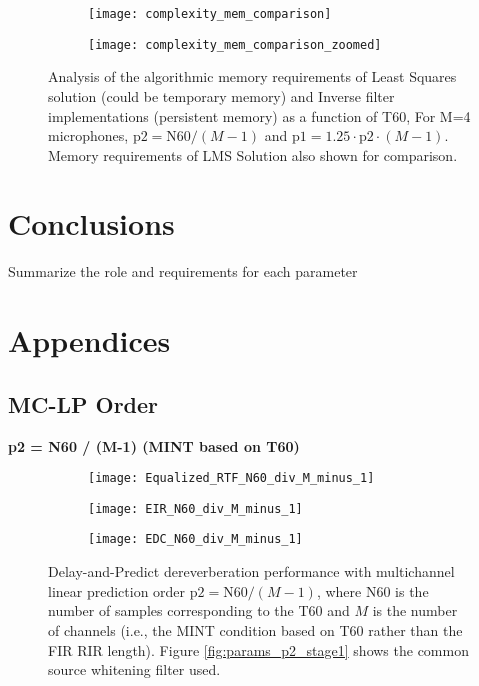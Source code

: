 \begin{figure}[H]
	\centering
	\begin{subfigure}[b]{0.45\textwidth}
		\centering
		\texttt{[image: complexity\_mem\_comparison]}
	\end{subfigure}
	\hfill
	\begin{subfigure}[b]{0.45\textwidth}
		\centering
		\texttt{[image: complexity\_mem\_comparison\_zoomed]}
	\end{subfigure}
	\caption{Analysis of the algorithmic memory requirements  of Least Squares solution (could be temporary memory) and Inverse filter implementations (persistent memory) as a function of T60, For M=4 microphones, $\mathrm{p2} = \mathrm{N60}/(M-1)$ and $\mathrm{p1} = 1.25 \cdot \mathrm{p2} \cdot (M-1)$. Memory requirements of LMS Solution also shown for comparison.}
	\label{fig:complexity_memory}
\end{figure}



\section{Conclusions}

Summarize the role and requirements for each parameter



\section{Appendices}

\subsection{MC-LP Order}

\textbf{p2 = N60 / (M-1)  (MINT based on T60)}

\begin{figure}[H]
	\centering
	\begin{subfigure}[b]{0.32\textwidth}
		\centering
		\texttt{[image: Equalized\_RTF\_N60\_div\_M\_minus\_1]}
	\end{subfigure}
	\hfill
	\begin{subfigure}[b]{0.32\textwidth}
		\centering
		\texttt{[image: EIR\_N60\_div\_M\_minus\_1]}
	\end{subfigure}
	\hfill
	\begin{subfigure}[b]{0.32\textwidth}
		\centering
		\texttt{[image: EDC\_N60\_div\_M\_minus\_1]}
	\end{subfigure}
	\hfill
	\caption{Delay-and-Predict dereverberation performance with multichannel linear prediction order $\mathrm{p2} = \mathrm{N60} / (M-1)$, where N60 is the number of samples corresponding to the T60 and $M$ is the number of channels (i.e., the MINT condition based on T60 rather than the FIR RIR length). Figure \ref{fig:params_p2_stage1} shows the common source whitening filter used.}
	\label{fig:params_p2_N60}
\end{figure}

